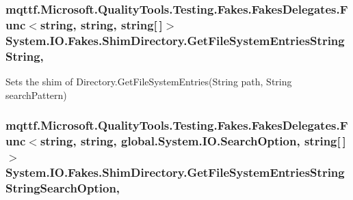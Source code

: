 \hypertarget{class_system_1_1_i_o_1_1_fakes_1_1_shim_directory_a4c632d5c1da40c0106a755f3ac0748be}{
\subsubsection[{Get\-File\-System\-Entries\-String\-String}]{\setlength{\rightskip}{0pt plus 5cm}mqttf.\-Microsoft.\-Quality\-Tools.\-Testing.\-Fakes.\-Fakes\-Delegates.\-Func$<$string, string, string\mbox{[}$\,$\mbox{]}$>$ System.\-I\-O.\-Fakes.\-Shim\-Directory.\-Get\-File\-System\-Entries\-String\-String\hspace{0.3cm}{\ttfamily [static]}, {\ttfamily [set]}}}\label{class_system_1_1_i_o_1_1_fakes_1_1_shim_directory_a4c632d5c1da40c0106a755f3ac0748be}


Sets the shim of Directory.\-Get\-File\-System\-Entries(\-String path, String search\-Pattern)

\hypertarget{class_system_1_1_i_o_1_1_fakes_1_1_shim_directory_a9b63eff11744a7bf62bd4d3fb956b54e}{
\subsubsection[{Get\-File\-System\-Entries\-String\-String\-Search\-Option}]{\setlength{\rightskip}{0pt plus 5cm}mqttf.\-Microsoft.\-Quality\-Tools.\-Testing.\-Fakes.\-Fakes\-Delegates.\-Func$<$string, string, global.\-System.\-I\-O.\-Search\-Option, string\mbox{[}$\,$\mbox{]}$>$ System.\-I\-O.\-Fakes.\-Shim\-Directory.\-Get\-File\-System\-Entries\-String\-String\-Search\-Option\hspace{0.3cm}{\ttfamily [static]}, {\ttfamily [set]}}}\label{class_system_1_1_i_o_1_1_fakes_1_1_shim_directory_a9b63eff11744a7bf62bd4d3fb956b54e}



